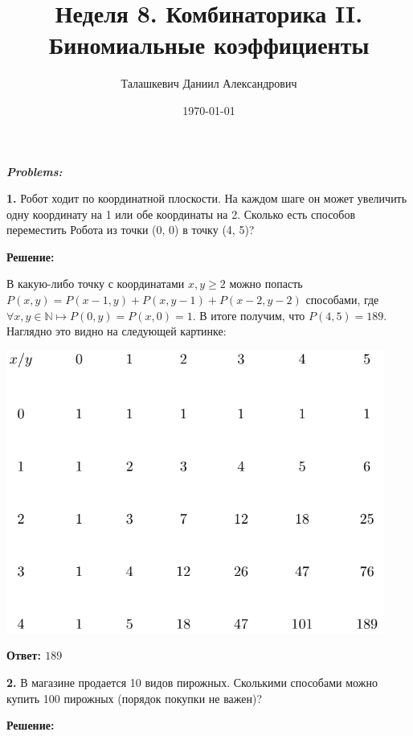 \documentclass[a4paper,12pt]{article} %
\author{Талашкевич Даниил Александрович}
\title{Неделя 8. Комбинаторика II.
Биномиальные коэффициенты}
\date{\today}
\begin{document}
\maketitle
\thispagestyle{empty}

\newpage
\setcounter{page}{1}
\begin{center}
\itshape
\bfseries
{ \Large Problems:}
\end{center}

{\bf 1.} Робот ходит по координатной плоскости. На каждом шаге он может
увеличить одну координату на 1 или обе координаты на 2. Сколько
есть способов переместить Робота из точки (0, 0) в точку (4, 5)?
\begin{center}
\bfseries
{\Large Решение: }
\end{center}

В какую-либо точку с координатами $x,y \geqslant 2$ можно попасть $P(x,y) = P(x-1,y) + P(x,y-1) + P(x-2,y-2)$ способами, где $ \forall x,y \in \mathbb {N} \mapsto P(0,y) = P(x,0) = 1 $. В итоге получим, что $P(4,5) = 189$. Наглядно это видно на следующей картинке:

\begin{center}
\includegraphics[scale = 0.8]{8 1}
\end{center}

\begin{flushright}
\begin{large}
\textbf {Ответ: $189$}
\end{large}
\end{flushright}

{\bf 2.} В магазине продается 10 видов пирожных. Сколькими способами
можно купить 100 пирожных (порядок покупки не важен)?
\begin{center}
\bfseries
{\Large Решение: }
\end{center}
\end{document}
